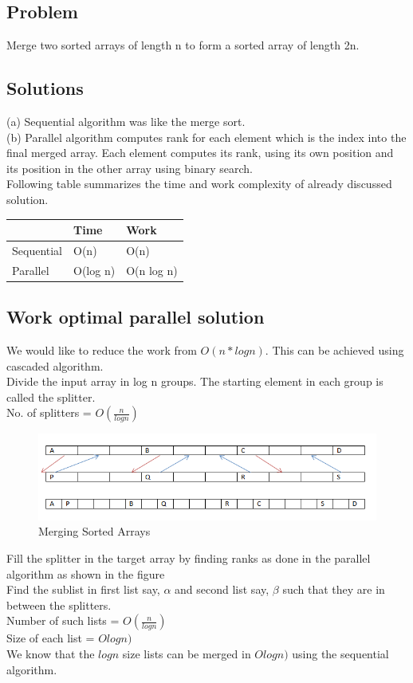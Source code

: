 \documentclass[twoside]{article}
\begin{document}
\subsection{Problem}
Merge two sorted arrays of length n to form a sorted array of length 2n.

\subsection{Solutions}
(a) Sequential algorithm was like the merge sort.\\
(b) Parallel algorithm computes rank for each element which is the index into the final merged array. Each element computes its rank, using its own position and its position in the other array using binary search.\\
Following table summarizes the time and work complexity of already discussed solution.
\begin{table}[h]
\centering
\label{my-label}
\begin{tabular}{|l|l|l|}
\hline
           & Time     & Work       \\ \hline
Sequential & O(n)     & O(n)       \\ \hline
Parallel   & O(log n) & O(n log n) \\ \hline
\end{tabular}
\end{table}
\subsection{Work optimal parallel solution}
We would like to reduce the work from \(O(n*logn)\). This can be achieved using cascaded algorithm.\\ Divide the input array in log n groups. The starting element in each group is called the splitter.\\
No. of splitters = \( O\left(\frac{n}{log n}\right)\)\\
\begin{figure}[H]
  \centering
  \includegraphics[height=0.250\textheight, width=0.750\linewidth]{1.PNG} 
  \caption{Merging Sorted Arrays}
  \label{fig:1}
\end{figure}
Fill the splitter in the target array by finding ranks as done in the parallel algorithm as shown in the figure\\
Find the sublist in first list say, $\alpha$ and second list say, $\beta$ such that they are in between the splitters.\\
Number of such lists = \( O\left(\frac{n}{log n}\right)\)\\
Size of each list = \(Olog n)\)\\
We know that the \(log n\) size lists can be merged in \(Olog n)\) using the sequential algorithm.\\ 
\end{document}
